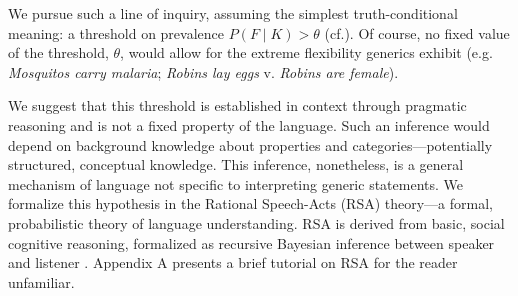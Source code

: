 \documentclass[12pt,letterpaper]{article}
\begin{document}
We pursue such a line of inquiry, assuming the simplest truth-conditional meaning: a threshold on prevalence $P(F\mid K)>\theta$ (cf.).
Of course, no fixed value of the threshold, $\theta$, would allow for the extreme flexibility generics exhibit (e.g. \emph{Mosquitos carry malaria}; \emph{Robins lay eggs} v. \emph{Robins are female}).%

We suggest that this threshold is established in context through pragmatic reasoning and is not a fixed property of the language.
Such an inference would depend on background knowledge about properties and categories---potentially structured, conceptual knowledge.
This inference, nonetheless, is a general mechanism of language not specific to interpreting generic statements.
We formalize this hypothesis in the Rational Speech-Acts (RSA) theory---a formal, probabilistic theory of language understanding.
RSA is derived from basic, social cognitive reasoning, formalized as recursive Bayesian inference between speaker and listener \cite{Frank2012,Goodman2013}.
Appendix A presents a brief tutorial on RSA for the reader unfamiliar.

\end{document}
